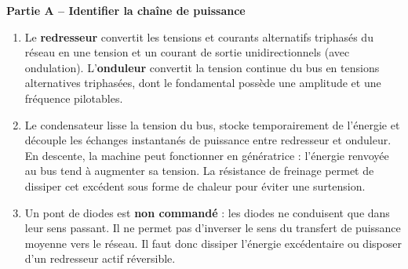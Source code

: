 \documentclass[11pt,a4paper]{article}
\newcommand{\partie}[1]{\vspace{0.7em}\noindent\textbf{\large #1}\par\vspace{0.25em}}
\begin{document}
\partie{Partie A -- Identifier la chaîne de puissance}
\begin{enumerate}[label=\textbf{A\arabic*.}]
\item Le \textbf{redresseur} convertit les tensions et courants alternatifs triphasés du réseau en une tension et un courant de sortie unidirectionnels (avec ondulation). L'\textbf{onduleur} convertit la tension continue du bus en tensions alternatives triphasées, dont le fondamental possède une amplitude et une fréquence pilotables.
\item Le condensateur lisse la tension du bus, stocke temporairement de l'énergie et découple les échanges instantanés de puissance entre redresseur et onduleur. En descente, la machine peut fonctionner en génératrice : l'énergie renvoyée au bus tend à augmenter sa tension. La résistance de freinage permet de dissiper cet excédent sous forme de chaleur pour éviter une surtension.
\item Un pont de diodes est \textbf{non commandé} : les diodes ne conduisent que dans leur sens passant. Il ne permet pas d'inverser le sens du transfert de puissance moyenne vers le réseau. Il faut donc dissiper l'énergie excédentaire ou disposer d'un redresseur actif réversible.
\end{enumerate}
\end{document}
